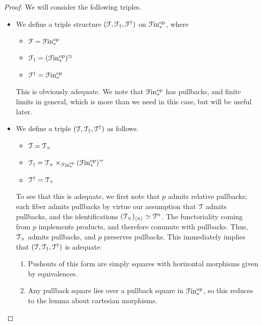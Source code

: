 \documentclass[main.tex]{subfiles}
\begin{document}
\begin{proof}
  We will consider the following triples.

  \begin{itemize}
    \item We define a triple structure $(\mathcal{F}, \mathcal{F}_{\dagger}, \mathcal{F}^{\dagger})$ on $\mathcal{F}\mathrm{in}_{*}^{\mathrm{op}}$, where
      \begin{itemize}
        \item $\mathcal{F} = \mathcal{F}\mathrm{in}_{*}^{\mathrm{op}}$

        \item $\mathcal{F}_{\dagger} = (\mathcal{F}\mathrm{in}_{*}^{\mathrm{op}})^{\simeq}$

        \item $\mathcal{F}^{\dagger} = \mathcal{F}\mathrm{in}_{*}^{\mathrm{op}}$
      \end{itemize}

      This is obviously adequate. We note that $\mathcal{F}\mathrm{in}_{*}^{\mathrm{op}}$ has pullbacks, and finite limits in general, which is more than we need in this case, but will be useful later.

    \item We define a triple $(\mathcal{T}, \mathcal{T}_{\dagger}, \mathcal{T}^{\dagger})$ as follows.
      \begin{itemize}
        \item $\mathcal{T} = \mathcal{T}_{\times}$

        \item $\mathcal{T}_{\dagger} = \mathcal{T}_{\times} \times_{\mathcal{F}\mathrm{in}_{*}^{\mathrm{op}}}(\mathcal{F}\mathrm{in}_{*}^{\mathrm{op}})^{\simeq}$

        \item $\mathcal{T}^{\dagger} = \mathcal{T}_{\times}$
      \end{itemize}

      To see that this is adequate, we first note that $p$ admits relative pullbacks; each fiber admits pullbacks by virtue our assumption that $\mathcal{T}$ admits pullbacks, and the identifications $( \mathcal{T}_{\times} )_{\langle n \rangle} \simeq \mathcal{T}^{n}$. The functoriality coming from $p$ implements products, and therefore commute with pullbacks. Thus, $\mathcal{T}_{\times}$ admits pullbacks, and $p$ preserves pullbacks. This immediately implies that $(\mathcal{T}, \mathcal{T}_{\dagger}, \mathcal{T}^{\dagger})$ is adequate:
      \begin{enumerate}
        \item Pushouts of this form are simply squares with horizontal morphisms given by equivalences.

        \item Any pullback square lies over a pullback square in $\mathcal{F}\mathrm{in}_{*}^{\mathrm{op}}$, so this reduces to the lemma about cartesian morphisms.
      \end{enumerate}


\end{itemize}
\end{proof}
\end{document}
